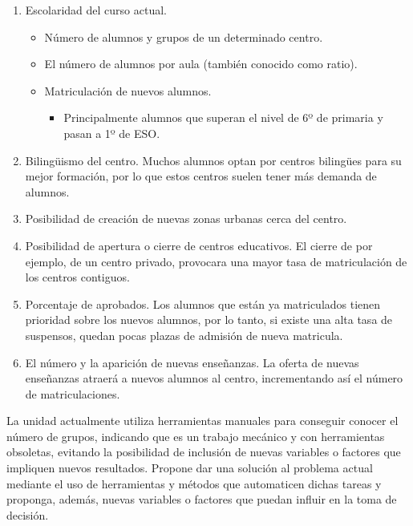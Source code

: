 \documentclass[spanish,12pt, a4paper,twoside]{paper}
\begin{document}
\begin{enumerate}
\item Escolaridad del curso actual.
\begin{itemize}
\item Número de alumnos y grupos de un determinado centro.
\item El número de alumnos por aula (también conocido como ratio).
\item Matriculación de nuevos alumnos.
\begin{itemize}
\item Principalmente alumnos que superan el nivel de 6º de primaria y pasan a 1º de ESO.
\end{itemize}
\end{itemize}

\item Bilingüismo del centro. Muchos alumnos optan por centros bilingües para su mejor formación, por lo que estos centros suelen tener más demanda de alumnos.
\item Posibilidad de creación de nuevas zonas urbanas cerca del centro. 
\item Posibilidad de apertura o cierre de centros educativos. El cierre de por ejemplo, de un centro privado, provocara una mayor tasa de matriculación de los centros contiguos. 
\item Porcentaje de aprobados. Los alumnos que están ya matriculados tienen prioridad sobre los nuevos alumnos, por lo tanto, si existe una alta tasa de suspensos, quedan pocas plazas de admisión de nueva matricula.
\item El número y la aparición de nuevas enseñanzas. La oferta de nuevas enseñanzas atraerá a nuevos alumnos al centro, incrementando así el número de matriculaciones.
\end{enumerate}

\justify
La unidad actualmente utiliza herramientas manuales para conseguir conocer el número de grupos, indicando que es un trabajo mecánico y con herramientas obsoletas, evitando la posibilidad de inclusión de nuevas variables o factores que impliquen nuevos resultados.
\justify
Propone dar una solución al problema actual mediante el uso de herramientas y métodos que automaticen dichas tareas y proponga, además, nuevas variables o factores que puedan influir en la toma de decisión. 
\end{document}
